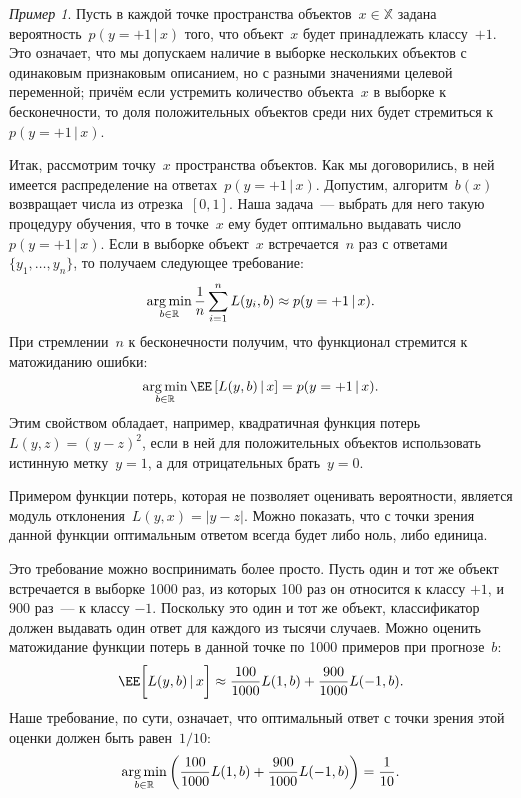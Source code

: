 \documentclass[a4paper, 12pt]{article}
\newcommand{\argmin}{\mathop{\rm arg\,min}\limits}
\newcommand{\cond}{\mspace{3mu}{|}\mspace{3mu}}
\def\XX{\mathbb{X}}
\def\RR{\mathbb{R}}
\theoremstyle{plain} %
\theoremstyle{definition} %
\theoremstyle{remark} %
\newtheorem{example}{Пример}
\begin{document}
\begin{example}
Пусть в каждой точке пространства объектов~$x \in \XX$ задана вероятность~$p(y = +1 \cond x)$
того, что объект~$x$ будет принадлежать классу~$+1$.
Это означает, что мы допускаем наличие в выборке нескольких объектов
с одинаковым признаковым описанием, но с разными значениями целевой переменной;
причём если устремить количество объекта~$x$ в выборке к бесконечности,
то доля положительных объектов среди них будет стремиться к~$p(y = +1 \cond x)$.

Итак, рассмотрим точку~$x$ пространства объектов.
Как мы договорились, в ней имеется распределение на ответах~$p(y = +1 \cond x)$.
Допустим, алгоритм~$b(x)$ возвращает числа из отрезка~$[0, 1]$.
Наша задача~--- выбрать для него такую процедуру обучения, что в точке~$x$
ему будет оптимально выдавать число~$p(y = +1 \cond x)$.
Если в выборке объект~$x$ встречается~$n$ раз с ответами~$\{y_1, \dots, y_n\}$,
то получаем следующее требование:
\[
    \argmin_{b \in \RR}
    \frac{1}{n}
    \sum_{i = 1}^{n}
        L(y_i, b)
    \approx
    p(y = +1 \cond x).
\]
При стремлении~$n$ к бесконечности получим, что функционал стремится к матожиданию ошибки:
\[
    \argmin_{b \in \RR}
    \EE \left[
        L(y, b)
        \cond
        x
    \right]
    =
    p(y = +1 \cond x).
\]
Этим свойством обладает, например, квадратичная функция потерь~$L(y, z) = (y - z)^2$,
если в ней для положительных объектов использовать истинную метку~$y = 1$, а для отрицательных брать~$y = 0$.

Примером функции потерь, которая не позволяет оценивать вероятности, является модуль отклонения~$L(y, x) = |y - z|$.
Можно показать, что с точки зрения данной функции оптимальным ответом всегда будет либо ноль, либо единица.

Это требование можно воспринимать более просто.
Пусть один и тот же объект встречается в выборке 1000 раз,
из которых 100 раз он относится к классу $+1$, и 900 раз~--- к классу $-1$.
Поскольку это один и тот же объект, классификатор должен выдавать один ответ
для каждого из тысячи случаев.
Можно оценить матожидание функции потерь в данной точке по 1000 примеров при прогнозе~$b$:
\[
    \EE \biggl[
        L(y, b)
        \cond
        x
    \biggr]
    \approx
    \frac{100}{1000}
    L(1, b)
    +
    \frac{900}{1000}
    L(-1, b).
\]
Наше требование, по сути, означает, что оптимальный ответ
с точки зрения этой оценки должен быть равен~$1/10$:
\[
    \argmin_{b \in \RR} \left(
        \frac{100}{1000} L(1, b)
        +
        \frac{900}{1000} L(-1, b)
    \right)
    =
    \frac{1}{10}.
\]


\end{example}
\end{document}
